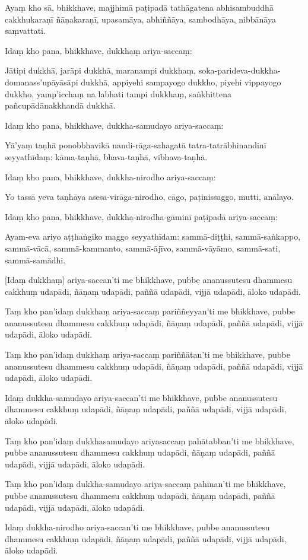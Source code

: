 Ayaṃ kho sā, bhikkhave, majjhimā paṭipadā tathāgatena abhisambuddhā
cakkhukaraṇī ñāṇakaraṇī, upasamāya, abhiññāya, sambodhāya, nibbānāya
saṃvattati.

Idaṃ kho pana, bhikkhave, dukkhaṃ ariya-saccaṃ:

Jātipi dukkhā, jarāpi dukkhā, maranampi dukkhaṃ,
soka-parideva-dukkha-domanass'upāyāsāpi dukkhā, appiyehi sampayogo
dukkho, piyehi vippayogo dukkho, yamp'icchaṃ na labhati tampi dukkhaṃ,
saṅkhittena pañcupādānakkhandā dukkhā.

Idaṃ kho pana, bhikkhave, dukkha-samudayo ariya-saccaṃ:

Yā'yaṃ taṇhā ponobbhavikā nandi-rāga-sahagatā tatra-tatrābhinandinī
seyyathīdaṃ: kāma-taṇhā, bhava-taṇhā, vibhava-taṇhā.

Idaṃ kho pana, bhikkhave, dukkha-nirodho ariya-saccaṃ:

Yo tassā yeva taṇhāya asesa-virāga-nirodho, cāgo, paṭinissaggo, mutti,
anālayo.

Idaṃ kho pana, bhikkhave, dukkha-nirodha-gāminī paṭipadā ariya-saccaṃ:

Ayam-eva ariyo aṭṭhaṅgiko maggo seyyathīdam: sammā-diṭṭhi,
sammā-saṅkappo, sammā-vācā, sammā-kammanto, sammā-ājīvo, sammā-vāyāmo,
sammā-sati, sammā-samādhi.

[Idaṃ dukkhaṃ] ariya-saccan'ti me bhikkhave, pubbe ananussutesu dhammesu
cakkhuṃ udapādi, ñāṇaṃ udapādi, paññā udapādi, vijjā udapādi, āloko
udapādi.

Taṃ kho pan'idaṃ dukkhaṃ ariya-saccaṃ pariññeyyan'ti me bhikkhave, pubbe
ananussutesu dhammesu cakkhuṃ udapādi, ñāṇaṃ udapādi, paññā udapādi,
vijjā udapādi, āloko udapādi.

Taṃ kho pan'idaṃ dukkhaṃ ariya-saccaṃ pariññātan'ti me bhikkhave, pubbe
ananussutesu dhammesu cakkhuṃ udapādi, ñāṇaṃ udapādi, paññā udapādi,
vijjā udapādi, āloko udapādi.

Idaṃ dukkha-samudayo ariya-saccan'ti me bhikkhave, pubbe ananussutesu
dhammesu cakkhuṃ udapādi, ñāṇaṃ udapādi, paññā udapādi, vijjā udapādi,
āloko udapādi.

Taṃ kho pan'idaṃ dukkhasamudayo ariyasaccaṃ pahātabban'ti me bhikkhave,
pubbe ananussutesu dhammesu cakkhuṃ udapādi, ñāṇaṃ udapādi, paññā
udapādi, vijjā udapādi, āloko udapādi.

Taṃ kho pan'idaṃ dukkha-samudayo ariya-saccaṃ pahīnan'ti me bhikkhave, pubbe
ananussutesu dhammesu cakkhuṃ udapādi, ñāṇaṃ udapādi, paññā udapādi,
vijjā udapādi, āloko udapādi.

Idaṃ dukkha-nirodho ariya-saccan'ti me bhikkhave, pubbe ananussutesu
dhammesu cakkhuṃ udapādi, ñāṇaṃ udapādi, paññā udapādi, vijjā udapādi,
āloko udapādi.


